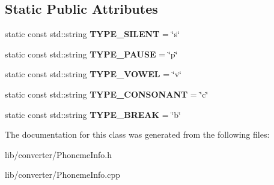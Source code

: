 \subsection*{\-Static \-Public \-Attributes}
\begin{DoxyCompactItemize}
\item 
\hypertarget{classsinsy_1_1PhonemeInfo_a6774418020b6be35e68b117d59a92d5a}{static const std\-::string {\bfseries \-T\-Y\-P\-E\-\_\-\-S\-I\-L\-E\-N\-T} = \char`\"{}s\char`\"{}}\label{classsinsy_1_1PhonemeInfo_a6774418020b6be35e68b117d59a92d5a}

\item 
\hypertarget{classsinsy_1_1PhonemeInfo_a6d6c06ae1b9458f8d6ea7376bda07316}{static const std\-::string {\bfseries \-T\-Y\-P\-E\-\_\-\-P\-A\-U\-S\-E} = \char`\"{}p\char`\"{}}\label{classsinsy_1_1PhonemeInfo_a6d6c06ae1b9458f8d6ea7376bda07316}

\item 
\hypertarget{classsinsy_1_1PhonemeInfo_a28436d8bf5c117d481d63ace30e6fb77}{static const std\-::string {\bfseries \-T\-Y\-P\-E\-\_\-\-V\-O\-W\-E\-L} = \char`\"{}v\char`\"{}}\label{classsinsy_1_1PhonemeInfo_a28436d8bf5c117d481d63ace30e6fb77}

\item 
\hypertarget{classsinsy_1_1PhonemeInfo_acfd4cc1a64f7902816502aa56e0b0f18}{static const std\-::string {\bfseries \-T\-Y\-P\-E\-\_\-\-C\-O\-N\-S\-O\-N\-A\-N\-T} = \char`\"{}c\char`\"{}}\label{classsinsy_1_1PhonemeInfo_acfd4cc1a64f7902816502aa56e0b0f18}

\item 
\hypertarget{classsinsy_1_1PhonemeInfo_acab80523b911adc4c76ea6d273e89b71}{static const std\-::string {\bfseries \-T\-Y\-P\-E\-\_\-\-B\-R\-E\-A\-K} = \char`\"{}b\char`\"{}}\label{classsinsy_1_1PhonemeInfo_acab80523b911adc4c76ea6d273e89b71}

\end{DoxyCompactItemize}


\-The documentation for this class was generated from the following files\-:\begin{DoxyCompactItemize}
\item 
lib/converter/\-Phoneme\-Info.\-h\item 
lib/converter/\-Phoneme\-Info.\-cpp\end{DoxyCompactItemize}
